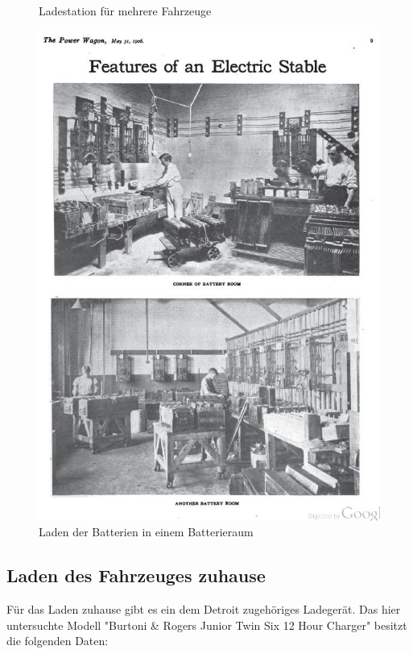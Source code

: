 \begin{landscape}
\begin{figure}
\begin{minipage}{0.65\textwidth}
	\caption{Ladestation für mehrere Fahrzeuge \cite{laden_alt}}
	\label{fig:Laden_Garage}
\end{minipage}
\begin{minipage}{0.65\textwidth}
	\includegraphics[width=\textwidth]{images/Laden_Batterieraum.jpg}
	\caption{Laden der Batterien in einem Batterieraum \cite{laden_alt}}
	\label{fig:Laden_Batterieraum}
\end{minipage}
\end{figure}
\end{landscape}

\subsection{Laden des Fahrzeuges zuhause}
Für das Laden zuhause gibt es ein dem Detroit zugehöriges Ladegerät. Das hier untersuchte Modell "Burtoni \& Rogers Junior Twin Six 12 Hour Charger" besitzt die folgenden Daten:

